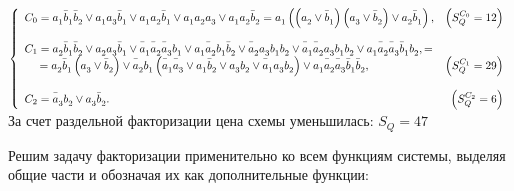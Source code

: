 \documentclass[a4paper, 12pt]{article}
\begin{document}
$\left\lbrace\begin{array}{l r}
	C_0={\mathstrut a}_1\bar{\mathstrut b}_1\bar{\mathstrut b}_2\vee 
	{\mathstrut a}_1{\mathstrut a}_3\bar{\mathstrut b}_1\vee
	{\mathstrut a}_1{\mathstrut a}_2\bar{\mathstrut b}_1\vee
	{\mathstrut a}_1{\mathstrut a}_2{\mathstrut a}_3\vee
	{\mathstrut a}_1{\mathstrut a}_2\bar{\mathstrut b}_2=
	{\mathstrut a}_1\left(\left({\mathstrut a}_2\vee\bar{\mathstrut b}_1\right)
	\left({\mathstrut a}_3\vee\bar{\mathstrut b}_2\right)\vee
	{\mathstrut a}_2\bar{\mathstrut b}_1\right), &
	\left(S_Q^{C_0}=12\right)\\\\
	
	C_1={\mathstrut a}_2\bar{\mathstrut b}_1\bar{\mathstrut b}_2\vee
	{\mathstrut a}_2{\mathstrut a}_3\bar{\mathstrut b}_1\vee
	\bar{\mathstrut a}_1\bar{\mathstrut a}_2\bar{\mathstrut a}_3{\mathstrut b}_1\vee
	{\mathstrut a}_1\bar{\mathstrut a}_2{\mathstrut b}_1\bar{\mathstrut b}_2\vee
	\bar{\mathstrut a}_2{\mathstrut a}_3{\mathstrut b}_1{\mathstrut b}_2\vee
	\bar{\mathstrut a}_1\bar{\mathstrut a}_2{\mathstrut a}_3{\mathstrut b}_1{\mathstrut b}_2\vee
	{\mathstrut a}_1\bar{\mathstrut a}_2\bar{\mathstrut a}_3\bar{\mathstrut b}_1{\mathstrut b}_2, = & \\
	\quad\ ={\mathstrut a}_2\bar{\mathstrut b}_1\left({\mathstrut a}_3\vee
	\bar{\mathstrut b}_2\right)\vee\bar{\mathstrut a}_2{\mathstrut b}_1\left(
	\bar{\mathstrut a}_1\bar{\mathstrut a}_3\vee{\mathstrut a}_1\bar{\mathstrut b}_2\vee
	{\mathstrut a}_3{\mathstrut b}_2\vee\bar{\mathstrut a}_1{\mathstrut a}_3
	{\mathstrut b}_2\right)\vee{\mathstrut a}_1\bar{\mathstrut a}_2\bar{\mathstrut a}_3
	\bar{\mathstrut b}_1\bar{\mathstrut b}_2, & 
	\left(S_Q^{C_1}=29\right)\\\\
	
	C_2=\bar{\mathstrut a}_3{\mathstrut b}_2\vee
	{\mathstrut a}_3\bar{\mathstrut b}_2. &
	\left(S_Q^{C_2}=6\right)
\end{array}\right.$\\

За счет раздельной факторизации цена схемы уменьшилась: $S_Q=47$

Решим задачу факторизации применительно ко всем функциям системы, выделяя общие части и обозначая их как дополнительные функции:\\
\end{document}
